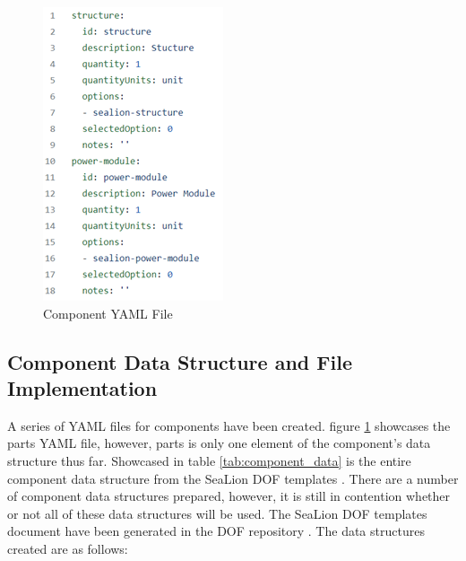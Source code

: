 \documentclass[journal,article,submit,pdftex,moreauthors]{Definitions/mdpi}
\begin{document}
\begin{figure}[H]
    \includegraphics[width=10.5 cm]{assets/components.png}
    \caption{Component YAML File}
	\label{fig:components}
    \end{figure}   
\unskip

\subsection{Component Data Structure and File Implementation}
A series of YAML files for components have been created.  figure \ref{fig:components} showcases the parts YAML file, however, parts is only one element of the component's data structure thus far.  Showcased in table \ref{tab:component_data} is the entire component data structure from the SeaLion DOF templates \cite{sealion_dof}.  There are a number of component data structures prepared, however, it is still in contention whether or not all of these data structures will be used.  The SeaLion DOF templates document have been generated in the DOF repository \cite{sealion_dof}.  The data structures created are as follows:
\end{document}
